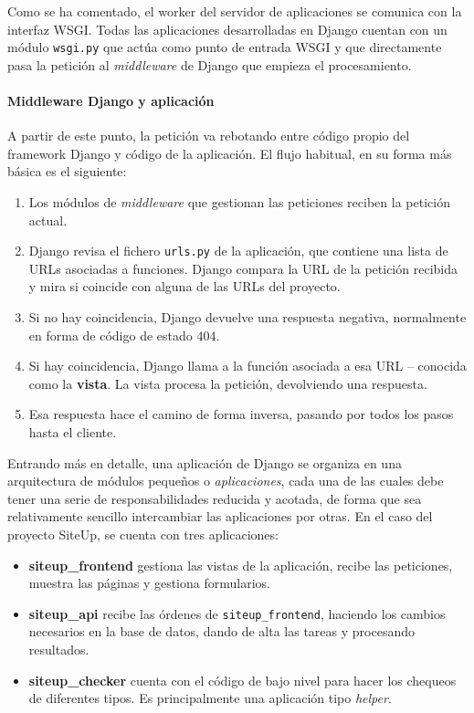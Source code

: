 Como se ha comentado, el worker del servidor de aplicaciones se comunica con la
interfaz WSGI. Todas las aplicaciones desarrolladas en Django cuentan con un
módulo \texttt{wsgi.py} que actúa como punto de entrada WSGI y que directamente
pasa la petición al \textit{middleware} de Django que empieza el procesamiento.

\paragraph{Middleware Django y aplicación}

A partir de este punto, la petición va rebotando entre código propio del
framework Django y código de la aplicación. El flujo habitual, en su forma más
básica es el siguiente:

\begin{enumerate}
\item Los módulos de \textit{middleware} que gestionan las peticiones reciben la
  petición actual.
\item Django revisa el fichero \texttt{urls.py} de la aplicación, que contiene
  una lista de URLs asociadas a funciones. Django compara la URL de la petición
  recibida y mira si coincide con alguna de las URLs del proyecto.
\item Si no hay coincidencia, Django devuelve una respuesta negativa,
  normalmente en forma de código de estado 404.
\item Si hay coincidencia, Django llama a la función asociada a esa URL --
  conocida como la \textbf{vista}. La vista procesa la petición, devolviendo una
  respuesta.
\item Esa respuesta hace el camino de forma inversa, pasando por todos los pasos
  hasta el cliente.
\end{enumerate}

Entrando más en detalle, una aplicación de Django se organiza en una
arquitectura de módulos pequeños o \textit{aplicaciones}, cada una de las cuales
debe tener una serie de responsabilidades reducida y acotada, de forma que sea
relativamente sencillo intercambiar las aplicaciones por otras. En el caso del
proyecto SiteUp, se cuenta con tres aplicaciones:

\begin{itemize}
\item \textbf{siteup\_frontend} gestiona las vistas de la aplicación, recibe las
  peticiones, muestra las páginas y gestiona formularios.

\item \textbf{siteup\_api} recibe las órdenes de \texttt{siteup\_frontend},
  haciendo los cambios necesarios en la base de datos, dando de alta las tareas
  y procesando resultados.

\item \textbf{siteup\_checker} cuenta con el código de bajo nivel para hacer los
  chequeos de diferentes tipos. Es principalmente una aplicación tipo
  \textit{helper}.

\end{itemize}

